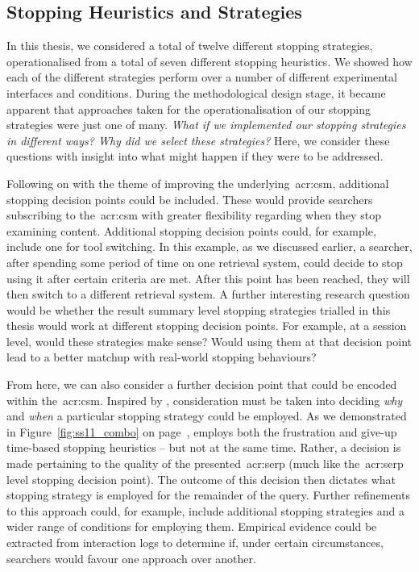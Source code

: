 \vspace*{-2mm}
\subsection{Stopping Heuristics and Strategies}\label{sec:conclusions:future:stopping}
In this thesis, we considered a total of twelve different stopping strategies, operationalised from a total of seven different stopping heuristics. We showed how each of the different strategies perform over a number of different experimental interfaces and conditions. During the methodological design stage, it became apparent that approaches taken for the operationalisation of our stopping strategies were just one of many. \emph{What if we implemented our stopping strategies in different ways? Why did we select these strategies?} Here, we consider these questions with insight into what might happen if they were to be addressed.

Following on with the theme of improving the underlying~\gls{acr:csm}, additional stopping decision points could be included. These would provide searchers subscribing to the~\gls{acr:csm} with greater flexibility regarding when they stop examining content. Additional stopping decision points could, for example, include one for tool switching. In this example, as we discussed earlier, a searcher, after spending some period of time on one retrieval system, could decide to stop using it after certain criteria are met. After this point has been reached, they will then switch to a different retrieval system. A further interesting research question would be whether the result summary level stopping strategies trialled in this thesis would work at different stopping decision points. For example, at a session level, would these strategies make sense? Would using them at that decision point lead to a better matchup with real-world stopping behaviours?

From here, we can also consider a further decision point that could be encoded within the~\gls{acr:csm}. Inspired by , consideration must be taken into deciding \emph{why} and \emph{when} a particular stopping strategy could be employed. As we demonstrated in Figure~\ref{fig:ss11_combo} on page~\pageref{fig:ss11_combo},  employs both the frustration and give-up time-based stopping heuristics -- but not at the same time. Rather, a decision is made pertaining to the quality of the presented~\gls{acr:serp} (much like the~\gls{acr:serp} level stopping decision point). The outcome of this decision then dictates what stopping strategy is employed for the remainder of the query. Further refinements to this approach could, for example, include additional stopping strategies and a wider range of conditions for employing them. Empirical evidence could be extracted from interaction logs to determine if, under certain circumstances, searchers would favour one approach over another.

